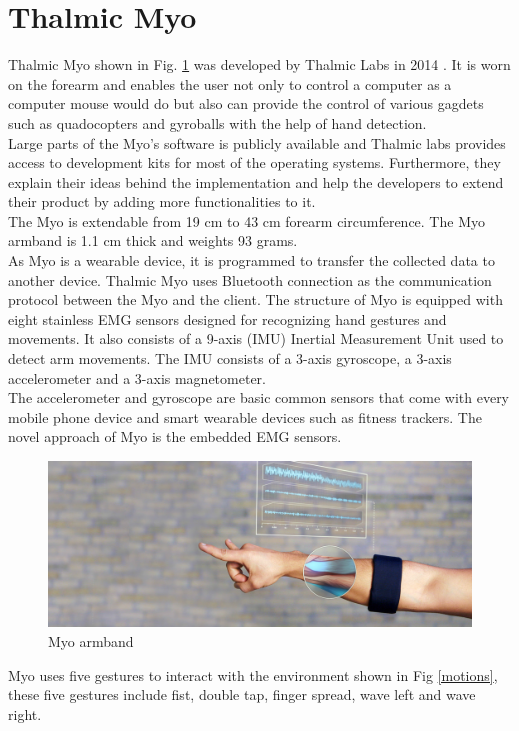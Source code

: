 \section{Thalmic Myo} 
Thalmic Myo shown in Fig. \ref{myo} was developed by Thalmic Labs in 2014 \cite{thalmic}. It is worn on the forearm and enables the user not only to control a computer as a computer mouse would do but also can provide the control of various gagdets such as quadocopters and gyroballs with the help of hand detection.  \\
Large parts of the Myo's software \cite{myo_developer} is publicly available and Thalmic labs provides access to development kits for most of the operating systems. Furthermore, they explain their ideas behind the implementation and help the developers to extend their product by adding more functionalities to it. \\
The Myo is extendable from 19 cm to 43 cm forearm circumference. The Myo armband is 1.1 cm thick and weights 93 grams. \\
As Myo is a wearable device, it is programmed to transfer the collected data to another device. Thalmic Myo uses Bluetooth connection as the communication protocol between the Myo and the client. The structure of Myo is equipped with eight stainless EMG sensors designed for recognizing hand gestures and movements. It also consists of a 9-axis (IMU) Inertial Measurement Unit used to detect arm movements. The IMU consists of a 3-axis gyroscope, a 3-axis accelerometer and a 3-axis magnetometer. \\ The accelerometer and gyroscope are basic common sensors that come with every mobile phone device and smart wearable devices such as fitness trackers. The novel approach of Myo is the embedded EMG sensors.
\begin{figure}[H]
\includegraphics[width=15cm,left,keepaspectratio]{figures/myo}
\caption{Myo armband}
\label{myo}
\end{figure}
Myo uses five gestures to interact with the environment shown in Fig \ref{motions}, these five gestures include fist, double tap, finger spread, wave left and wave right. 
